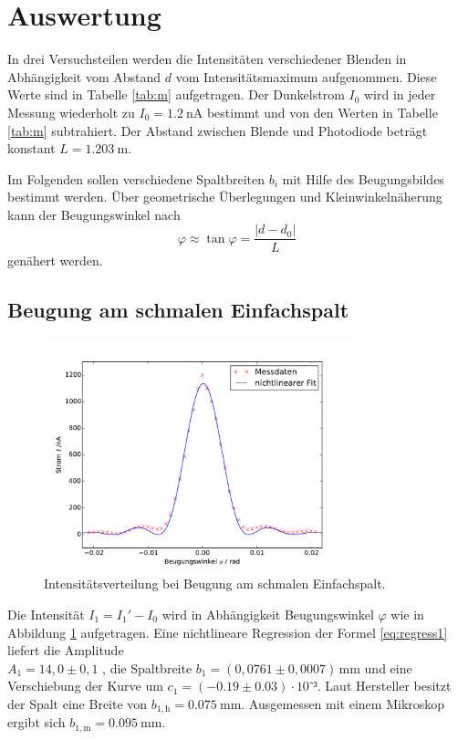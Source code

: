 \section{Auswertung}
\label{sec:Auswertung}

In drei Versuchsteilen werden die Intensitäten verschiedener Blenden in Abhängigkeit vom Abstand $d$ vom Intensitätsmaximum aufgenommen. 
Diese Werte sind in Tabelle \ref{tab:m} aufgetragen.
Der Dunkelstrom $I_0$ wird in jeder Messung wiederholt zu $I_0=\SI{1,2}{\nano\ampere}$ bestimmt und von den Werten in Tabelle \ref{tab:m} subtrahiert. 
Der Abstand zwischen Blende und Photodiode beträgt konstant $L=\SI{1,203}{\meter}$. 

Im Folgenden sollen verschiedene Spaltbreiten $b_i$ mit Hilfe des Beugungsbildes bestimmt werden. 
Über geometrische Überlegungen und Kleinwinkelnäherung kann der Beugungswinkel nach
\begin{equation}
	\varphi\approx \tan{\varphi}=\frac{|d-d_0|}{L}
	\label{eq:winkel}
\end{equation} 
genähert werden.

\subsection{Beugung am schmalen Einfachspalt}
\begin{figure}
\centering
	\includegraphics[width=0.8\textwidth]{Bilder/Messung1.pdf}
	\caption{Intensitätsverteilung bei Beugung am schmalen Einfachspalt.}
\label{fig:m1}
\end{figure}

Die Intensität $I_1={I_1}'-I_0$ wird in Abhängigkeit Beugungswinkel $\varphi$ wie in Abbildung \ref{fig:m1} aufgetragen. %
Eine nichtlineare Regression der Formel \eqref{eq:regress1} liefert die Amplitude \\$A_1=14,0\pm0,1$ ,
die Spaltbreite $b_1=({0,0761\pm0,0007}){\,\si{\milli\meter}}$ und eine Verschiebung der Kurve um $c_1=(-0.19\pm0.03)\cdot 10⁻³$. Laut Hersteller besitzt der Spalt eine Breite von $b_\mathup{1,h}=\SI{0.075}{\milli\meter}$. Ausgemessen mit einem Mikroskop ergibt sich $b_\mathup{1,m}=\SI{0.095}{\milli\meter}$.


